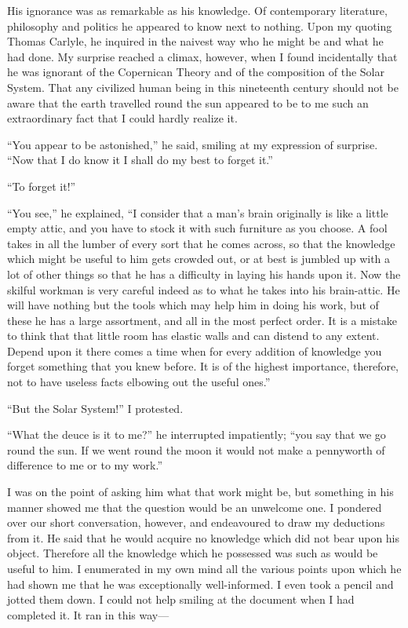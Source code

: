 \documentclass[12pt]{book}
\begin{document}
His ignorance was as remarkable as his knowledge. Of contemporary literature, philosophy and politics he appeared to know next to nothing. Upon my quoting Thomas Carlyle, he inquired in the naivest way who he might be and what he had done. My surprise reached a climax, however, when I found incidentally that he was ignorant of the Copernican Theory and of the composition of the Solar System. That any civilized human being in this nineteenth century should not be aware that the earth travelled round the sun appeared to be to me such an extraordinary fact that I could hardly realize it. 

“You appear to be astonished,” he said, smiling at my expression of surprise. “Now that I do know it I shall do my best to forget it.” 

“To forget it!” 

“You see,” he explained, “I consider that a man’s brain originally is like a little empty attic, and you have to stock it with such furniture as you choose. A fool takes in all the lumber of every sort that he comes across, so that the knowledge which might be useful to him gets crowded out, or at best is jumbled up with a lot of other things so that he has a difficulty in laying his hands upon it. Now the skilful workman is very careful indeed as to what he takes into his brain-attic. He will have nothing but the tools which may help him in doing his work, but of these he has a large assortment, and all in the most perfect order. It is a mistake to think that that little room has elastic walls and can distend to any extent. Depend upon it there comes a time when for every addition of knowledge you forget something that you knew before. It is of the highest importance, therefore, not to have useless facts elbowing out the useful ones.” 

“But the Solar System!” I protested. 

“What the deuce is it to me?” he interrupted impatiently; “you say that we go round the sun. If we went round the moon it would not make a pennyworth of difference to me or to my work.” 

I was on the point of asking him what that work might be, but something in his manner showed me that the question would be an unwelcome one. I pondered over our short conversation, however, and endeavoured to draw my deductions from it. He said that he would acquire no knowledge which did not bear upon his object. Therefore all the knowledge which he possessed was such as would be useful to him. I enumerated in my own mind all the various points upon which he had shown me that he was exceptionally well-informed. I even took a pencil and jotted them down. I could not help smiling at the document when I had completed it. It ran in this way— 
\end{document}
